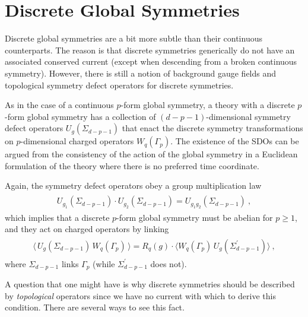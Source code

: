 \documentclass[11pt]{article}
\newcommand{\eq}[1]{\begin{align}\begin{split}#1\end{split}\end{align}}
\begin{document}
\section{Discrete Global Symmetries}
\label{sec:discrete}

Discrete global symmetries are a bit more subtle than their continuous counterparts. The reason is that discrete symmetries generically do not have an associated conserved current (except when descending from a broken continuous symmetry). However, there is still a notion of background gauge fields and topological symmetry defect operators for discrete symmetries. 



As in the case of a continuous $p$-form global symmetry, a theory with a discrete $p$-form global symmetry has a collection of $(d-p-1)$-dimensional symmetry defect operators $ U_g(\Sigma_{d-p-1})$ that enact the discrete symmetry transformations on $p$-dimensional charged operators $W_q(\Gamma_p)$. The existence of the SDOs can be argued from the consistency of the action of the global symmetry in a Euclidean formulation of the theory where there is no preferred time coordinate. 

Again, the symmetry defect operators obey a group multiplication law
%
\eq{
 U_{g_1}(\Sigma_{d-p-1})\cdot U_{g_2}(\Sigma_{d-p-1})= U_{g_1g_2}(\Sigma_{d-p-1})~,
}
which implies that a discrete $p$-form global symmetry must be abelian for $p\geq1$, 
and they act on charged operators by linking
\eq{
\big\langle\,  U_{g}(\Sigma_{d-p-1})\, W_q(\Gamma_p)\,\big\rangle=R_q(g)\cdot \big\langle W_q(\Gamma_p)\,U_g(\Sigma_{d-p-1}^\prime)\big\rangle~,
}
where $\Sigma_{d-p-1}$ links $\Gamma_p$ (while $\Sigma_{d-p-1}^\prime$ does not). 

A question that one might have is why discrete symmetries should be described by \emph{topological} operators since we have no current with which to derive this condition. There are several ways to see this fact. 
\end{document}
